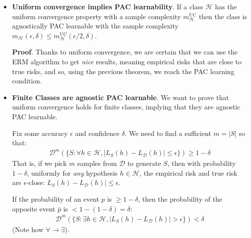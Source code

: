 \documentclass[../template.tex]{subfiles}
\begin{document}
\begin{itemize}
    \item \textbf{Uniform convergence implies PAC learnability}. If a class $\mathcal{H}$ has the uniform convergence property with a sample complexity $m_{\mathcal{H}}^{\mathrm{UC}}$ then the class is agnostically PAC learnable with the sample complexity $m_{\mathcal{H}}(\epsilon, \delta) \leq m_{\mathcal{H}}^{\mathrm{UC}}(\epsilon/2, \delta)$.
    
    \medskip

    \textbf{Proof}. Thanks to uniform convergence, we are certain that we can use the ERM algorithm to get \textit{nice} results, meaning empirical risks that are close to true risks, and so, using the previous theorem, we reach the PAC learning condition.

    \item \textbf{Finite Classes are agnostic PAC learnable}. 
    We want to prove that uniform convergence holds for finite classes, implying that they are agnostic PAC learnable.

    Fix some accuracy $\epsilon$ and confidence $\delta$. We need to find a sufficient $m = |S|$ so that:
    \begin{align*}
        \mathcal{D}^m(\{S \colon \forall h \in \mathcal{H}, |L_S(h) - L_{\mathcal{D}}(h)| \leq \epsilon \}) \geq 1-\delta
    \end{align*}
    That is, if we pick $m$ samples from $\mathcal{D}$ to generate $S$, then with probability $1-\delta$, uniformly for \textit{any} hypothesis $h \in \mathcal{H}$, the empirical risk and true risk are $\epsilon$-close: $L_S(h) - L_{\mathcal{D}}(h)| \leq \epsilon$.
    
    If the probability of an event $p$ is $\geq 1-\delta$, then the probability of the opposite event $\bar{p}$ is $< 1-(1-\delta) = \delta$:
    \begin{align*}
        \mathcal{D}^m(\{S \colon \exists h \in \mathcal{H}, |L_S(h) - L_{\mathcal{D}}(h)| > \epsilon \}) < \delta
    \end{align*} 
    (Note how $\forall \to \exists$).


\end{itemize}
\end{document}
